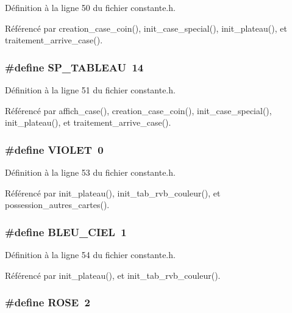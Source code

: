 D\'{e}finition \`{a} la ligne 50 du fichier constante.h.

R\'{e}f\'{e}renc\'{e} par creation\_\-case\_\-coin(), init\_\-case\_\-special(), init\_\-plateau(), et traitement\_\-arrive\_\-case().
\subsubsection{\setlength{\rightskip}{0pt plus 5cm}\#define SP\_\-TABLEAU~14}\label{constante_8h_fc3248815d7e95d7720016a9bdff4912}




D\'{e}finition \`{a} la ligne 51 du fichier constante.h.

R\'{e}f\'{e}renc\'{e} par affich\_\-case(), creation\_\-case\_\-coin(), init\_\-case\_\-special(), init\_\-plateau(), et traitement\_\-arrive\_\-case().
\subsubsection{\setlength{\rightskip}{0pt plus 5cm}\#define VIOLET~0}\label{constante_8h_928ad872921809adddfdd7f5d260fac0}




D\'{e}finition \`{a} la ligne 53 du fichier constante.h.

R\'{e}f\'{e}renc\'{e} par init\_\-plateau(), init\_\-tab\_\-rvb\_\-couleur(), et possession\_\-autres\_\-cartes().
\subsubsection{\setlength{\rightskip}{0pt plus 5cm}\#define BLEU\_\-CIEL~1}\label{constante_8h_2e5824f38e2020bb669ddaa1b2ec5df4}




D\'{e}finition \`{a} la ligne 54 du fichier constante.h.

R\'{e}f\'{e}renc\'{e} par init\_\-plateau(), et init\_\-tab\_\-rvb\_\-couleur().
\subsubsection{\setlength{\rightskip}{0pt plus 5cm}\#define ROSE~2}\label{constante_8h_30283739677a9ab6664959f69e2d8dde}




